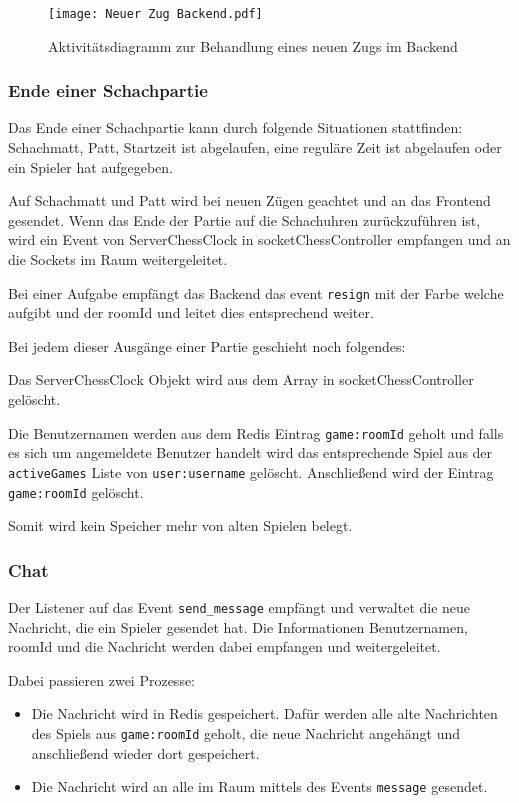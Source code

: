 \begin{figure}[h!]
\centering
\texttt{[image: Neuer Zug Backend.pdf]}
\caption{Aktivitätsdiagramm zur Behandlung eines neuen Zugs im Backend}
\label{fig:Zug-Backend}
\end{figure}

\subsubsection{Ende einer Schachpartie}
\label{sec:Schach-Ende}
Das Ende einer Schachpartie kann durch folgende Situationen stattfinden:
Schachmatt, Patt, Startzeit ist abgelaufen, eine reguläre Zeit ist abgelaufen oder ein Spieler hat aufgegeben.

Auf Schachmatt und Patt wird bei neuen Zügen geachtet und an das Frontend gesendet. Wenn das Ende der Partie auf die Schachuhren zurückzuführen ist, wird ein Event von ServerChessClock in socketChessController empfangen und an die Sockets im Raum weitergeleitet. 

Bei einer Aufgabe empfängt das Backend das event \verb|resign| mit der Farbe welche aufgibt und der roomId und leitet dies entsprechend weiter.

Bei jedem dieser Ausgänge einer Partie geschieht noch folgendes:

Das ServerChessClock Objekt wird aus dem Array in socketChessController gelöscht.

Die Benutzernamen werden aus dem Redis Eintrag \verb|game:roomId| geholt und falls es sich um angemeldete Benutzer handelt wird das entsprechende Spiel aus der \verb|activeGames| Liste von \verb|user:username| gelöscht. Anschließend wird der Eintrag \verb|game:roomId| gelöscht.

Somit wird kein Speicher mehr von alten Spielen belegt.

\subsubsection{Chat}
Der Listener auf das Event \verb|send_message| empfängt und verwaltet die neue Nachricht, die ein Spieler gesendet hat. Die Informationen Benutzernamen, roomId und die Nachricht werden dabei empfangen und weitergeleitet.

Dabei passieren zwei Prozesse:
\begin{itemize}
\item Die Nachricht wird in Redis gespeichert. Dafür werden alle alte Nachrichten des Spiels aus \verb|game:roomId| geholt, die neue Nachricht angehängt und anschließend wieder dort gespeichert.
\item Die Nachricht wird an alle im Raum mittels des Events \verb|message| gesendet.
\end{itemize}

